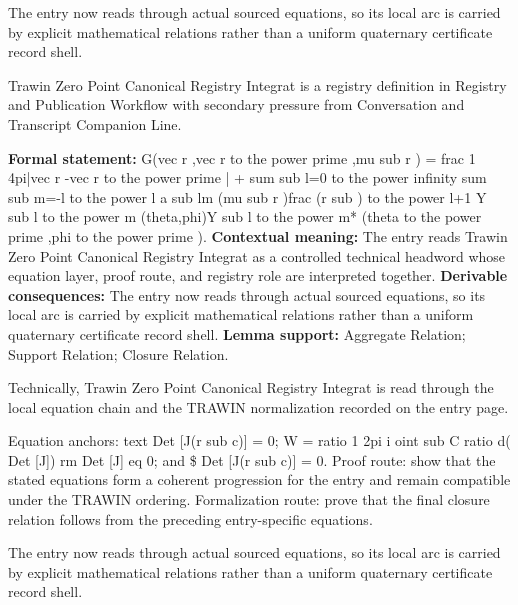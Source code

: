 The entry now reads through actual sourced equations, so its local arc is carried by explicit mathematical relations rather than a uniform quaternary certificate record shell.
\clearpage


\begingroup\small
{}
Trawin Zero Point Canonical Registry Integrat is a registry definition in Registry and Publication Workflow with secondary pressure from Conversation and Transcript Companion Line.

\begingroup\footnotesize\setlength{\emergencystretch}{3em}\sloppy
\textbf{Formal statement:} G(vec r ,vec r to the power prime ,mu sub r ) = frac 1 4pi|vec r -vec r to the power prime | + sum sub l=0 to the power infinity sum sub m=-l to the power l a sub lm (mu sub r )frac (r sub ) to the power l+1 Y sub l to the power m (theta,phi)Y sub l to the power m* (theta to the power prime ,phi to the power prime ). \textbf{Contextual meaning:} The entry reads Trawin Zero Point Canonical Registry Integrat as a controlled technical headword whose equation layer, proof route, and registry role are interpreted together. \textbf{Derivable consequences:} The entry now reads through actual sourced equations, so its local arc is carried by explicit mathematical relations rather than a uniform quaternary certificate record shell. \textbf{Lemma support:} Aggregate Relation; Support Relation; Closure Relation.\par
\endgroup

Technically, Trawin Zero Point Canonical Registry Integrat is read through the local equation chain and the TRAWIN normalization recorded on the entry page.

Equation anchors: text Det [J(r sub c)] = 0; W = ratio 1 2pi i oint sub C ratio d( Det [J]) rm Det [J] eq 0; and \$ Det [J(r sub c)] = 0. Proof route: show that the stated equations form a coherent progression for the entry and remain compatible under the TRAWIN ordering. Formalization route: prove that the final closure relation follows from the preceding entry-specific equations.

The entry now reads through actual sourced equations, so its local arc is carried by explicit mathematical relations rather than a uniform quaternary certificate record shell.
\endgroup

